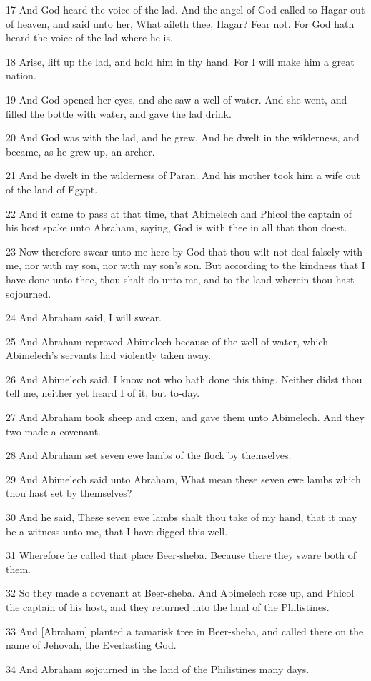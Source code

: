 \par 17 And God heard the voice of the lad. And the angel of God called to Hagar out of heaven, and said unto her, What aileth thee, Hagar? Fear not. For God hath heard the voice of the lad where he is.
\par 18 Arise, lift up the lad, and hold him in thy hand. For I will make him a great nation.
\par 19 And God opened her eyes, and she saw a well of water. And she went, and filled the bottle with water, and gave the lad drink.
\par 20 And God was with the lad, and he grew. And he dwelt in the wilderness, and became, as he grew up, an archer.
\par 21 And he dwelt in the wilderness of Paran. And his mother took him a wife out of the land of Egypt.
\par 22 And it came to pass at that time, that Abimelech and Phicol the captain of his host spake unto Abraham, saying, God is with thee in all that thou doest.
\par 23 Now therefore swear unto me here by God that thou wilt not deal falsely with me, nor with my son, nor with my son's son. But according to the kindness that I have done unto thee, thou shalt do unto me, and to the land wherein thou hast sojourned.
\par 24 And Abraham said, I will swear.
\par 25 And Abraham reproved Abimelech because of the well of water, which Abimelech's servants had violently taken away.
\par 26 And Abimelech said, I know not who hath done this thing. Neither didst thou tell me, neither yet heard I of it, but to-day.
\par 27 And Abraham took sheep and oxen, and gave them unto Abimelech. And they two made a covenant.
\par 28 And Abraham set seven ewe lambs of the flock by themselves.
\par 29 And Abimelech said unto Abraham, What mean these seven ewe lambs which thou hast set by themselves?
\par 30 And he said, These seven ewe lambs shalt thou take of my hand, that it may be a witness unto me, that I have digged this well.
\par 31 Wherefore he called that place Beer-sheba. Because there they sware both of them.
\par 32 So they made a covenant at Beer-sheba. And Abimelech rose up, and Phicol the captain of his host, and they returned into the land of the Philistines.
\par 33 And [Abraham] planted a tamarisk tree in Beer-sheba, and called there on the name of Jehovah, the Everlasting God.
\par 34 And Abraham sojourned in the land of the Philistines many days.

